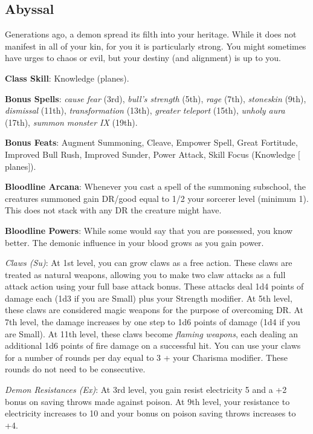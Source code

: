 \subsection{Abyssal}

				
Generations ago, a demon spread its filth into your heritage. While it does not manifest in all of your kin, for you it is particularly strong. You might sometimes have urges to chaos or evil, but your destiny (and alignment) is up to you.
				
\textbf{Class Skill}: Knowledge (planes).
				
\textbf{Bonus Spells}: \textit{cause fear} (3rd), \textit{bull's strength} (5th), \textit{rage} (7th), \textit{stoneskin} (9th), \textit{dismissal} (11th), \textit{transformation} (13th), \textit{greater teleport} (15th), \textit{unholy aura} (17th), \textit{summon monster IX} (19th).
				
\textbf{Bonus Feats}: Augment Summoning, Cleave, Empower Spell, Great Fortitude, Improved Bull Rush, Improved Sunder, Power Attack, Skill Focus (Knowledge \mbox{$[$}planes\mbox{$]$}).
				
\textbf{Bloodline Arcana}: Whenever you cast a spell of the summoning subschool, the creatures summoned gain DR/good equal to 1/2 your sorcerer level (minimum 1). This does not stack with any DR the creature might have.
				
\textbf{Bloodline Powers}: While some would say that you are possessed, you know better. The demonic influence in your blood grows as you gain power.
				
\textit{Claws (Su)}: At 1st level, you can grow claws as a free action. These claws are treated as natural weapons, allowing you to make two claw attacks as a full attack action using your full base attack bonus. These attacks deal 1d4 points of damage each (1d3 if you are Small) plus your Strength modifier. At 5th level, these claws are considered magic weapons for the purpose of overcoming DR. At 7th level, the damage increases by one step to 1d6 points of damage (1d4 if you are Small). At 11th level, these claws become \textit{flaming} \textit{weapons}, each dealing an additional 1d6 points of fire damage on a successful hit. You can use your claws for a number of rounds per day equal to 3 + your Charisma modifier. These rounds do not need to be consecutive.
				
\textit{Demon Resistances (Ex)}: At 3rd level, you gain resist electricity 5 and a +2 bonus on saving throws made against poison. At 9th level, your resistance to electricity increases to 10 and your bonus on poison saving throws increases to +4.
				
